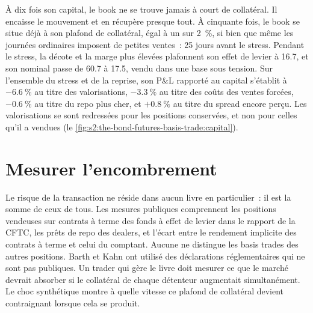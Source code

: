 À dix fois son capital, le book ne se trouve jamais à court de collatéral. Il encaisse le mouvement et en récupère presque tout. À cinquante fois, le book se situe déjà à
son plafond de collatéral, égal à un sur 2~\%, si bien que même les journées ordinaires imposent de petites ventes~: 25 jours avant le stress. Pendant le stress, la décote et la marge plus élevées plafonnent son
effet de levier à 16.7, et son nominal passe de 60.7 à 17.5, vendu dans une base sous tension. Sur l'ensemble du stress et de la reprise, son P\&L rapporté au capital s'établit à $-6.6~\%$ au titre des valorisations, $-3.3~\%$ au titre des coûts des ventes forcées, $-0.6~\%$ au titre du
repo plus cher, et $+0.8~\%$ au titre du spread encore perçu. Les valorisations se sont redressées pour les positions conservées, et non pour celles qu'il a vendues
(le \cref{fig:s2:the-bond-futures-basis-trade:capital}).

\begin{omfigure}

\label{fig:s2:the-bond-futures-basis-trade:capital}
\end{omfigure}

\section{Mesurer l'encombrement}

Le risque de la transaction ne réside dans aucun livre en particulier~: il est la somme de ceux de tous. Les mesures publiques comprennent les positions vendeuses sur contrats à terme des fonds à effet de levier dans le rapport de la CFTC, les prêts de repo des dealers,
et l'écart entre le rendement implicite des contrats à terme et celui du comptant. Aucune ne distingue les basis trades des autres positions. Barth et Kahn ont utilisé
des déclarations réglementaires qui ne sont pas publiques. Un trader qui gère le livre doit mesurer ce que le marché devrait absorber si le collatéral de chaque détenteur
augmentait simultanément. Le choc synthétique montre à quelle vitesse ce plafond de collatéral devient contraignant lorsque cela se produit.


